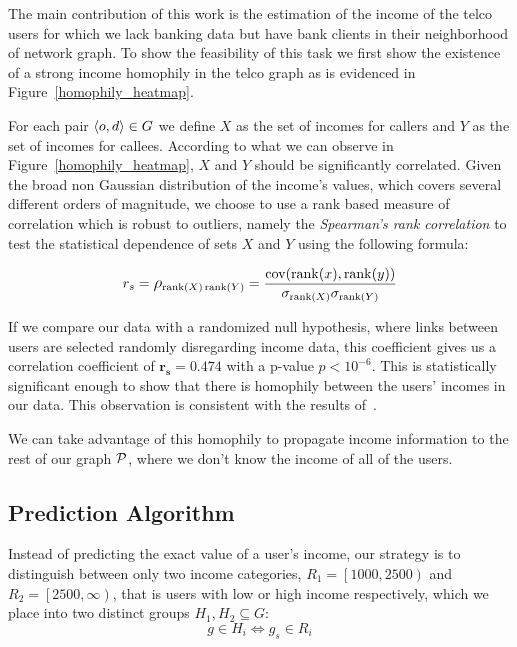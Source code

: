 The main contribution of this work is the estimation of the income of the telco users for which we lack banking data but have bank clients in their neighborhood of network graph. To show the feasibility of this task we first show the existence of a strong income homophily in the telco graph as is evidenced in Figure~\ref{homophily_heatmap}.


For each pair \( \left< o, d \right> \in \mathlarger{G} \) we define \( X \) as the set of incomes for callers and \( Y \) as the set of incomes for callees. According to what we can observe in Figure~\ref{homophily_heatmap}, \( X \) and \( Y \) should be significantly correlated. Given the broad non Gaussian distribution of the income's values, which covers several different  orders of magnitude, we choose to use a rank based measure of correlation which is robust to outliers, namely the \textit{Spearman's rank correlation} %
to test the statistical dependence of sets \( X \) and \( Y \) using the following formula:

\begin{equation}
r_s = \mathlarger{\rho}_{\operatorname{rank}(X) \operatorname{rank}(Y)} = \frac{\operatorname{cov}(\operatorname{rank}(x), \operatorname{rank}(y))}{\sigma_{\operatorname{rank}(X)} \sigma_{\operatorname{rank}(Y)}}
\label{spearman}
\end{equation}

If we compare our data with a randomized null hypothesis, where links between users are selected randomly disregarding income data, this coefficient gives us a correlation coefficient of $\mathbf{r_s = 0.474} $ with a p-value $ p < 10^{-6} $. This is statistically significant enough to show that there is homophily between the users' incomes in our data.
This observation is consistent with the results of~\cite{leo2015socioeconomic}.

We can take advantage of this homophily to propagate income information to the rest of our graph $ \mathcal{P} $, where we don't know the income of all of the users.


\subsection{Prediction Algorithm}

Instead of predicting the exact value of a user's income, our strategy is to distinguish between only two income categories, $R_1 = \left[1000, 2500\right)$ and $R_2 = \left[2500, \infty\right)$, that is users with low or high income respectively, which we place into two distinct groups $ H_1, H_2 \subseteq G$:
\[
	g \in H_i \iff g_s \in R_i
\]

